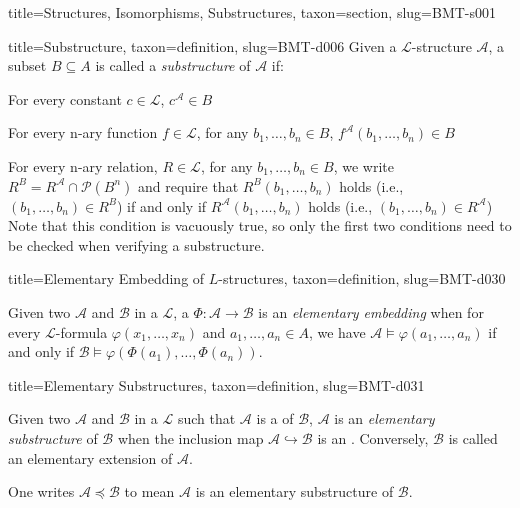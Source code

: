 \documentclass[a4paper]{article}
\begin{document}
\begin{tree}{title={Structures, Isomorphisms, Substructures}, taxon={section}, slug={BMT-s001}}
\begin{tree}{title={Substructure}, taxon={definition}, slug={BMT-d006}}
Given a \(\mathcal {L}\)-structure \(\mathcal {A}\), a subset \(B  \subseteq  A\) is called a \emph{substructure} of \(\mathcal {A}\) if:\par{For every constant \(c \in   \mathcal {L}\), \(c^{ \mathcal {A}}  \in  B\)}\par{For every n-ary function \(f \in   \mathcal {L}\), for any \(b_1, \dots , b_n  \in  B\), \(f^{ \mathcal {A}}(b_1, \dots ,b_n)  \in  B\)}\par{For every n-ary relation, \(R \in   \mathcal {L}\), for any \(b_1, \dots , b_n  \in  B\), we write \(R^B = R^{ \mathcal {A}} \cap   \mathcal {P}(B^n)\) and require that
\(R^{B}(b_1, \dots , b_n)\) holds (i.e., \((b_1, \dots , b_n)  \in  R^{B}\))  if and only if \(R^{ \mathcal {A}}(b_1, \dots , b_n)\) holds (i.e., \((b_1, \dots , b_n)  \in  R^{ \mathcal {A}}\)) 
Note that this condition is vacuously true, so only the first two conditions need to be checked when verifying a substructure.}
\end{tree}

\begin{tree}{title={Elementary Embedding of \(L\)-structures}, taxon={definition}, slug={BMT-d030}}

    Given two  \(\mathcal {A}\) and \(\mathcal {B}\) in a  \(\mathcal {L}\),
    a  \(\Phi \colon \mathcal {A}  \to   \mathcal {B}\) is an \emph{elementary embedding} when
    for every \(\mathcal  L\)-formula \(\varphi (x_1, \dots ,x_n)\) and \(a_1, \dots ,a_n \in  A\),
    we have \(\mathcal  A \vDash \varphi (a_1, \dots ,a_n)\) if and only if \(\mathcal  B \vDash \varphi ( \Phi (a_1), \dots , \Phi (a_n))\).

\end{tree}

\begin{tree}{title={Elementary Substructures}, taxon={definition}, slug={BMT-d031}}

    Given two  \(\mathcal {A}\) and \(\mathcal {B}\) in a  \(\mathcal {L}\)
    such that \(\mathcal  A\) is a  of \(\mathcal  B\),
    \(\mathcal  A\) is an \emph{elementary substructure} of \(\mathcal  B\) when the inclusion map \(\mathcal  A \hookrightarrow \mathcal  B\)
    is an .
    Conversely, \(\mathcal  B\) is called an elementary extension of \(\mathcal  A\).
\par{
    One writes \(\mathcal  A \preceq \mathcal  B\) to mean \(\mathcal  A\) is an elementary substructure of \(\mathcal  B\).
}
\end{tree}

\end{tree}
\end{document}
